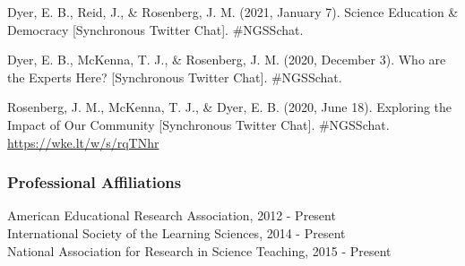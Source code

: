 \documentclass[
  14,
]{article}
\begin{document}
Dyer, E. B., Reid, J., \& Rosenberg, J. M. (2021, January 7). Science
Education \& Democracy {[}Synchronous Twitter Chat{]}. \#NGSSchat.

Dyer, E. B., McKenna, T. J., \& Rosenberg, J. M. (2020, December 3). Who
are the Experts Here? {[}Synchronous Twitter Chat{]}. \#NGSSchat.

Rosenberg, J. M., McKenna, T. J., \& Dyer, E. B. (2020, June 18).
Exploring the Impact of Our Community {[}Synchronous Twitter Chat{]}.
\#NGSSchat. \url{https://wke.lt/w/s/rqTNhr}

\hypertarget{professional-affiliations}{%
\subsubsection{Professional
Affiliations}\label{professional-affiliations}}

American Educational Research Association, 2012 - Present\\
International Society of the Learning Sciences, 2014 - Present\\
National Association for Research in Science Teaching, 2015 - Present
\end{document}
